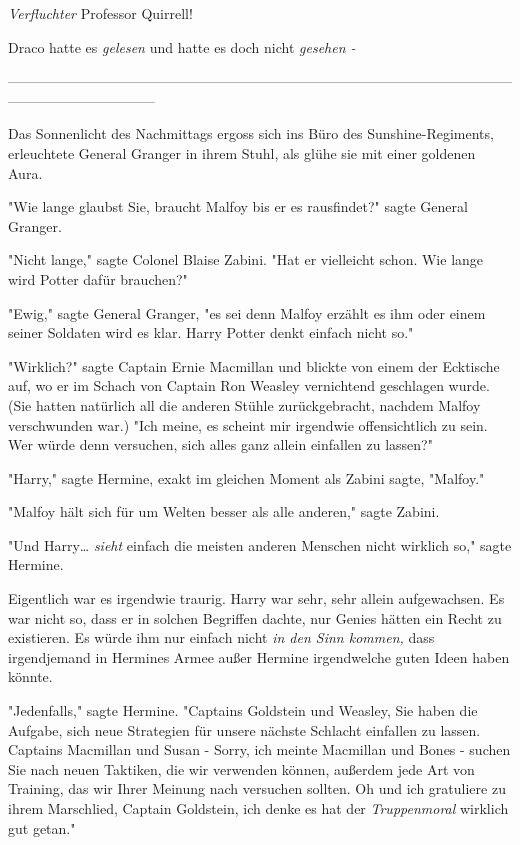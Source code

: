 {\emph{Verfluchter} Professor Quirrell!

Draco hatte es \emph{gelesen} und hatte es doch nicht \emph{gesehen -}

--------------------------------------------------------------------------------------------------------------------------------------------

Das Sonnenlicht des Nachmittags ergoss sich ins Büro des Sunshine-Regiments, erleuchtete General Granger in ihrem Stuhl, als glühe sie mit einer goldenen Aura.

"Wie lange glaubst Sie, braucht Malfoy bis er es rausfindet?" sagte General Granger.

"Nicht lange," sagte Colonel Blaise Zabini. "Hat er vielleicht schon. Wie lange wird Potter dafür brauchen?"

"Ewig," sagte General Granger, "es sei denn Malfoy erzählt es ihm oder einem seiner Soldaten wird es klar. Harry Potter denkt einfach nicht so."

"Wirklich?" sagte Captain Ernie Macmillan und blickte von einem der Ecktische auf, wo er im Schach von Captain Ron Weasley vernichtend geschlagen wurde. (Sie hatten natürlich all die anderen Stühle zurückgebracht, nachdem Malfoy verschwunden war.) "Ich meine, es scheint mir irgendwie offensichtlich zu sein. Wer würde denn versuchen, sich alles ganz allein einfallen zu lassen?"

"Harry," sagte Hermine, exakt im gleichen Moment als Zabini sagte, "Malfoy."

"Malfoy hält sich für um Welten besser als alle anderen," sagte Zabini.

"Und Harry… \emph{sieht} einfach die meisten anderen Menschen nicht wirklich so," sagte Hermine.

Eigentlich war es irgendwie traurig. Harry war sehr, sehr allein aufgewachsen. Es war nicht so, dass er in solchen Begriffen dachte, nur Genies hätten ein Recht zu existieren. Es würde ihm nur einfach nicht \emph{in den Sinn kommen,} dass irgendjemand in Hermines Armee außer Hermine irgendwelche guten Ideen haben könnte.

"Jedenfalls," sagte Hermine. "Captains Goldstein und Weasley, Sie haben die Aufgabe, sich neue Strategien für unsere nächste Schlacht einfallen zu lassen. Captains Macmillan und Susan - Sorry, ich meinte Macmillan und Bones - suchen Sie nach neuen Taktiken, die wir verwenden können, außerdem jede Art von Training, das wir Ihrer Meinung nach versuchen sollten. Oh und ich gratuliere zu ihrem Marschlied, Captain Goldstein, ich denke es hat der \emph{Truppenmoral} wirklich gut getan."

}
